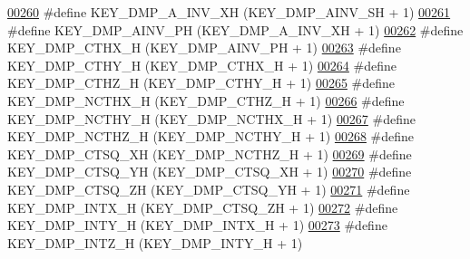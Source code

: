 \begin{DoxyCode}
\hypertarget{dmp_key_8h_source.tex_l00260}{}\hyperlink{dmp_key_8h_a35c6bae9104e5181a35c6a808e7a65fc}{00260} \textcolor{preprocessor}{#define KEY\_DMP\_A\_INV\_XH            (KEY\_DMP\_AINV\_SH + 1)}
\hypertarget{dmp_key_8h_source.tex_l00261}{}\hyperlink{dmp_key_8h_a1e8e4cd27c89df79a58b09fec5b95f4c}{00261} \textcolor{preprocessor}{#define KEY\_DMP\_AINV\_PH             (KEY\_DMP\_A\_INV\_XH + 1)}
\hypertarget{dmp_key_8h_source.tex_l00262}{}\hyperlink{dmp_key_8h_a5848e728aacad5a425f4a5c3ed7a500f}{00262} \textcolor{preprocessor}{#define KEY\_DMP\_CTHX\_H              (KEY\_DMP\_AINV\_PH + 1)}
\hypertarget{dmp_key_8h_source.tex_l00263}{}\hyperlink{dmp_key_8h_a67b8ae62af92003fd452071b16d2fa20}{00263} \textcolor{preprocessor}{#define KEY\_DMP\_CTHY\_H              (KEY\_DMP\_CTHX\_H + 1)}
\hypertarget{dmp_key_8h_source.tex_l00264}{}\hyperlink{dmp_key_8h_a8a2add4a668b1d74ea608d9efc8bc137}{00264} \textcolor{preprocessor}{#define KEY\_DMP\_CTHZ\_H              (KEY\_DMP\_CTHY\_H + 1)}
\hypertarget{dmp_key_8h_source.tex_l00265}{}\hyperlink{dmp_key_8h_aad93cba2ac9fd2b0e5aa200c03fe5b0b}{00265} \textcolor{preprocessor}{#define KEY\_DMP\_NCTHX\_H             (KEY\_DMP\_CTHZ\_H + 1)}
\hypertarget{dmp_key_8h_source.tex_l00266}{}\hyperlink{dmp_key_8h_abdd6a4aba1149508cf939940d5ce1e25}{00266} \textcolor{preprocessor}{#define KEY\_DMP\_NCTHY\_H             (KEY\_DMP\_NCTHX\_H + 1)}
\hypertarget{dmp_key_8h_source.tex_l00267}{}\hyperlink{dmp_key_8h_a32c1477991a438d9c3c11465675bdc14}{00267} \textcolor{preprocessor}{#define KEY\_DMP\_NCTHZ\_H             (KEY\_DMP\_NCTHY\_H + 1)}
\hypertarget{dmp_key_8h_source.tex_l00268}{}\hyperlink{dmp_key_8h_ab61a9f07575290815a2bd193db7b56ab}{00268} \textcolor{preprocessor}{#define KEY\_DMP\_CTSQ\_XH             (KEY\_DMP\_NCTHZ\_H + 1)}
\hypertarget{dmp_key_8h_source.tex_l00269}{}\hyperlink{dmp_key_8h_a286ee2a5021630e3da18cca9dc15deb2}{00269} \textcolor{preprocessor}{#define KEY\_DMP\_CTSQ\_YH             (KEY\_DMP\_CTSQ\_XH + 1)}
\hypertarget{dmp_key_8h_source.tex_l00270}{}\hyperlink{dmp_key_8h_ac8c3e06a0141185c406f24af44f1a171}{00270} \textcolor{preprocessor}{#define KEY\_DMP\_CTSQ\_ZH             (KEY\_DMP\_CTSQ\_YH + 1)}
\hypertarget{dmp_key_8h_source.tex_l00271}{}\hyperlink{dmp_key_8h_a8dc9644f1f944bc9b737bc6fc5660a98}{00271} \textcolor{preprocessor}{#define KEY\_DMP\_INTX\_H              (KEY\_DMP\_CTSQ\_ZH + 1)}
\hypertarget{dmp_key_8h_source.tex_l00272}{}\hyperlink{dmp_key_8h_ad560e542748c0d1dbe4bc83e5fb91195}{00272} \textcolor{preprocessor}{#define KEY\_DMP\_INTY\_H              (KEY\_DMP\_INTX\_H + 1)}
\hypertarget{dmp_key_8h_source.tex_l00273}{}\hyperlink{dmp_key_8h_a6f915c26c147edce87bc035c93f2eff0}{00273} \textcolor{preprocessor}{#define KEY\_DMP\_INTZ\_H              (KEY\_DMP\_INTY\_H + 1)}

\end{DoxyCode}
